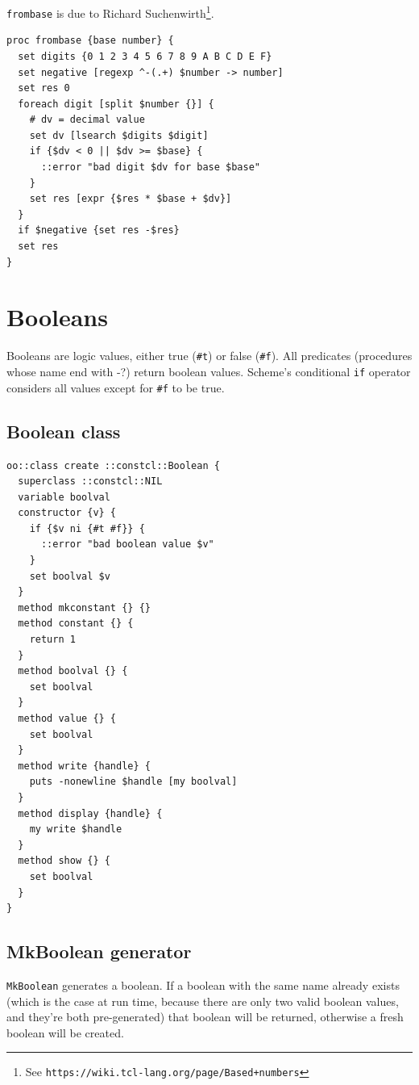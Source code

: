 \documentclass[twoside,9pt]{report}
\begin{document}
\texttt{frombase} is due to Richard Suchenwirth\footnote{See \texttt{https://wiki.tcl-lang.org/page/Based+numbers}}.

\begin{lstlisting}
proc frombase {base number} {
  set digits {0 1 2 3 4 5 6 7 8 9 A B C D E F}
  set negative [regexp ^-(.+) $number -> number]
  set res 0
  foreach digit [split $number {}] {
    # dv = decimal value
    set dv [lsearch $digits $digit]
    if {$dv < 0 || $dv >= $base} {
      ::error "bad digit $dv for base $base"
    }
    set res [expr {$res * $base + $dv}]
  }
  if $negative {set res -$res}
  set res
}
\end{lstlisting}
\section{Booleans}
\label{booleans}


Booleans are logic values, either true (\texttt{\#t}) or false (\texttt{\#f}). All predicates (procedures whose name end with -?) return boolean values. Scheme's conditional \texttt{if} operator considers all values except for \texttt{\#f} to be true.

\subsection{Boolean class}
\label{boolean-class}
\begin{lstlisting}
oo::class create ::constcl::Boolean {
  superclass ::constcl::NIL
  variable boolval
  constructor {v} {
    if {$v ni {#t #f}} {
      ::error "bad boolean value $v"
    }
    set boolval $v
  }
  method mkconstant {} {}
  method constant {} {
    return 1
  }
  method boolval {} {
    set boolval
  }
  method value {} {
    set boolval
  }
  method write {handle} {
    puts -nonewline $handle [my boolval]
  }
  method display {handle} {
    my write $handle
  }
  method show {} {
    set boolval
  }
}
\end{lstlisting}
\subsection{MkBoolean generator}
\label{mkboolean-generator}


\texttt{MkBoolean} generates a boolean. If a boolean with the same name already exists (which is the case at run time, because there are only two valid boolean values, and they're both pre-generated) that boolean will be returned, otherwise a fresh boolean will be created.
\end{document}
